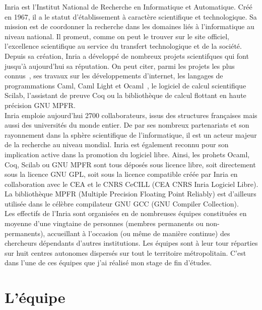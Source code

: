 \documentclass{report}
\begin{document}
Inria est l'Institut National de Recherche en Informatique et Automatique. Créé en 1967, il a le statut
d'établissement à caractère scientifique et technologique. Sa mission est de coordonner la recherche dans 
les domaines liés à l'informatique au niveau national. Il promeut, comme on peut le trouver sur le site officiel,
l'excellence scientifique au service du transfert technologique et de la société.
\\ Depuis sa création, Inria a développé de nombreux projets scientifques qui font jusqu'à aujourd'hui 
sa réputation.  On peut citer, parmi les projets les plus connus , ses travaux sur les développements 
d'internet, les langages de programmations Caml, Caml Light et Ocaml , le logiciel de calcul scientifique 
Scilab, l'assistant de preuve Coq ou la bibliothèque de calcul flottant en haute précision GNU MPFR.
\\ Inria emploie aujourd'hui 2700 collaborateurs, issus des structures françaises mais aussi des universités
du monde entier. De par ses nombreux partenariats et son rayonnement dans la sphère scientifique de 
l'informatique, il est un acteur majeur de la recherche au niveau mondial.
Inria est également reconnu pour son implication active dans la promotion du logiciel libre. Ainsi, les
prohets Ocaml, Coq, Scilab ou GNU MPFR sont tous déposés sous licence libre, soit directement sous la 
licence GNU GPL, soit sous la licence compatible créée par Inria en collaboration avec le CEA et le CNRS
 CeCILL (CEA CNRS Inria Logiciel Libre). La bibliothèque MPFR (Multiple Precision Floating Point Reliably)
 est d'ailleurs utilisée dans le célèbre compilateur GNU GCC (GNU Compiler Collection).
\\ Les effectifs de l'Inria sont organisées en de nombreuses équipes constituées en moyenne d'une vingtaine
 de personnes (membres permanents ou non-permanents), accueillant à l'occasion (ou même de manière continue)
des chercheurs dépendants d'autres institutions. Les équipes sont à leur tour réparties sur huit centres 
autonomes dispersés sur tout le territoire métropolitain. C'est dans l'une de ces équipes que j'ai réalisé
mon stage de fin d'études.

\section{L'équipe}
\end{document}
